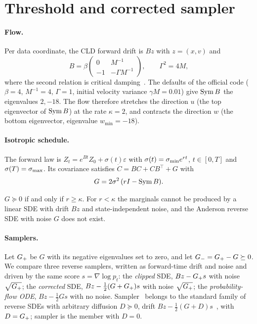 \section{Threshold and corrected sampler}
\label{sec:threshold}

\paragraph*{Flow.}
Per data coordinate, the CLD forward drift is $Bz$ with $z=(x,v)$ and
\begin{equation}
B=\beta\begin{pmatrix}0 & M^{-1}\\ -1 & -\Gamma M^{-1}\end{pmatrix},\qquad \Gamma^2=4M ,
\label{eq:B}
\end{equation}
where the second relation is critical damping~\cite{dockhorn2022cld}.
The defaults of the official code ($\beta=4$, $M^{-1}=4$, $\Gamma=1$, initial velocity variance $\gamma M=0.01$) give $\operatorname{Sym} B$ the eigenvalues $2, -18$.
The flow therefore stretches the direction $u$ (the top eigenvector of $\operatorname{Sym} B$) at the rate $\kappa=2$, and contracts the direction $w$ (the bottom eigenvector, eigenvalue $w_{\min}=-18$).

\paragraph*{Isotropic schedule.}
The forward law is $Z_t=e^{Bt}Z_0+\sigma(t)\varepsilon$ with $\sigma(t)=\sigma_{\min} e^{rt}$, $t\in[0,T]$ and $\sigma(T)=\sigma_{\max}$.
Its covariance satisfies $\dot C=BC+CB^{\top}+G$ with
\begin{equation}
G=2\sigma^2\,(rI-\operatorname{Sym} B).
\label{eq:G}
\end{equation}

\begin{proposition}
\label{prop:threshold}
$G\succeq 0$ if and only if $r\geq\kappa$.
For $r<\kappa$ the marginals cannot be produced by a linear SDE with drift $Bz$ and state-independent noise, and the Anderson reverse SDE with noise $G$ does not exist.
\end{proposition}

\paragraph*{Samplers.}
Let $G_{+}$ be $G$ with its negative eigenvalues set to zero, and let $G_{-}=G_{+}-G\succeq0$.
We compare three reverse samplers, written as forward-time drift and noise and driven by the same score $s=\nabla\log p_t$:
\Sa{} the \emph{clipped} SDE, $Bz-G_{+} s$ with noise $\sqrt{G_{+}}$;
\Sb{} the \emph{corrected} SDE, $Bz-\tfrac12(G+G_{+})s$ with noise $\sqrt{G_{+}}$;
\Sc{} the \emph{probability-flow ODE}, $Bz-\tfrac12 G s$ with no noise.
Sampler~\Sb{} belongs to the standard family of reverse SDEs with arbitrary diffusion $D\succeq0$, drift $Bz-\tfrac12(G+D)s$~\cite{song2021sde}, with $D=G_{+}$; sampler \Sc{} is the member with $D=0$.

